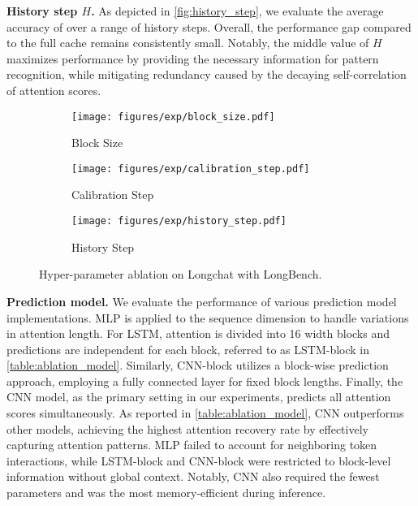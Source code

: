 \textbf{History step $H$.} As depicted in \autoref{fig:history_step}, we evaluate the average accuracy of \ours{} over a range of history steps. Overall, the performance gap compared to the full cache remains consistently small.
Notably, 
the middle value of $H$ maximizes performance by providing the necessary information for pattern recognition, while mitigating redundancy caused by the decaying self-correlation of attention scores.
\begin{figure*}[t]
    \centering
    
    \begin{subfigure}[b]{0.32\textwidth}
        \texttt{[image: figures/exp/block\_size.pdf]}  
        \caption{Block Size}
        \label{fig:block_size}
    \end{subfigure}
    \begin{subfigure}[b]{0.32\textwidth}
        \texttt{[image: figures/exp/calibration\_step.pdf]} 
        \caption{Calibration Step}
        \label{fig:calibration_step}
    \end{subfigure}
    \begin{subfigure}[b]{0.32\textwidth}
        \texttt{[image: figures/exp/history\_step.pdf]} 
         \caption{History Step}
        \label{fig:history_step}
    \end{subfigure}
    
    \caption{Hyper-parameter ablation on Longchat with LongBench.}
    \label{fig:ablation}
\end{figure*}



\textbf{Prediction model.} 
We evaluate the performance of various prediction model implementations. MLP is applied to the sequence dimension to handle variations in attention length. For LSTM, attention is divided into 16 width blocks and predictions are independent for each block, referred to as LSTM-block in \autoref{table:ablation_model}. Similarly, CNN-block utilizes a block-wise prediction approach, employing a fully connected layer for fixed block lengths. Finally, the CNN model, as the primary setting in our experiments, predicts all attention scores simultaneously.
As reported in \autoref{table:ablation_model}, CNN outperforms other models, achieving the highest attention recovery rate by effectively capturing attention patterns. MLP failed to account for neighboring token interactions, while LSTM-block and CNN-block were restricted to block-level information without global context. Notably, CNN also required the fewest parameters and was the most memory-efficient during inference.


